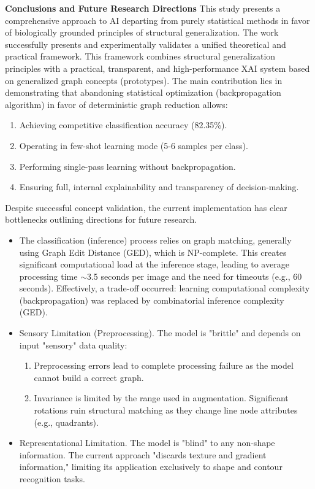 \documentclass[conference]{IEEEtran}
\begin{document}
\textbf{Conclusions and Future Research Directions}
This study presents a comprehensive approach to AI departing from purely statistical methods in favor of biologically grounded principles of structural generalization. The work successfully presents and experimentally validates a unified theoretical and practical framework. This framework combines structural generalization principles with a practical, transparent, and high-performance XAI system based on generalized graph concepts (prototypes).
The main contribution lies in demonstrating that abandoning statistical optimization (backpropagation algorithm) in favor of deterministic graph reduction allows:
\begin{enumerate}
    \item Achieving competitive classification accuracy (82.35\%).
    \item Operating in few-shot learning mode (5-6 samples per class).
    \item Performing single-pass learning without backpropagation.
    \item Ensuring full, internal explainability and transparency of decision-making.
\end{enumerate}

Despite successful concept validation, the current implementation has clear bottlenecks outlining directions for future research.
\begin{itemize}
    \item The classification (inference) process relies on graph matching, generally using Graph Edit Distance (GED), which is NP-complete. This creates significant computational load at the inference stage, leading to average processing time $\sim$3.5 seconds per image and the need for timeouts (e.g., 60 seconds). Effectively, a trade-off occurred: learning computational complexity (backpropagation) was replaced by combinatorial inference complexity (GED).
    \item Sensory Limitation (Preprocessing). The model is "brittle" and depends on input "sensory" data quality:
    \begin{enumerate}
        \item Preprocessing errors lead to complete processing failure as the model cannot build a correct graph.
        \item Invariance is limited by the range used in augmentation. Significant rotations ruin structural matching as they change line node attributes (e.g., quadrants).
    \end{enumerate}
    \item Representational Limitation. The model is "blind" to any non-shape information. The current approach "discards texture and gradient information," limiting its application exclusively to shape and contour recognition tasks.
\end{itemize}
\end{document}
